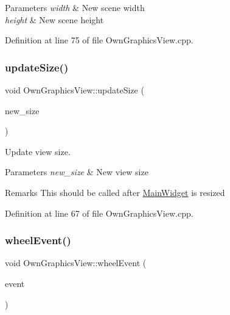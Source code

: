 \begin{DoxyParams}{Parameters}
{\em width} & New scene width \\
\hline
{\em height} & New scene height \\
\hline
\end{DoxyParams}


Definition at line 75 of file Own\+Graphics\+View.\+cpp.

\mbox{\label{classOwnGraphicsView_ac44fdf0870779587fcaf8855f905cdf3}} 
\subsubsection{\texorpdfstring{update\+Size()}{updateSize()}}
{\footnotesize\ttfamily void Own\+Graphics\+View\+::update\+Size (\begin{DoxyParamCaption}\item[{Q\+Size}]{new\+\_\+size }\end{DoxyParamCaption})}



Update view size. 


\begin{DoxyParams}{Parameters}
{\em new\+\_\+size} & New view size \\
\hline
\end{DoxyParams}
\begin{DoxyRemark}{Remarks}
This should be called after \mbox{\hyperlink{classMainWidget}{Main\+Widget}} is resized 
\end{DoxyRemark}


Definition at line 67 of file Own\+Graphics\+View.\+cpp.

\mbox{\label{classOwnGraphicsView_aa1fcab658f07793e921b8b79815d4430}} 
\subsubsection{\texorpdfstring{wheel\+Event()}{wheelEvent()}}
{\footnotesize\ttfamily void Own\+Graphics\+View\+::wheel\+Event (\begin{DoxyParamCaption}\item[{Q\+Wheel\+Event $\ast$}]{event }\end{DoxyParamCaption})}



